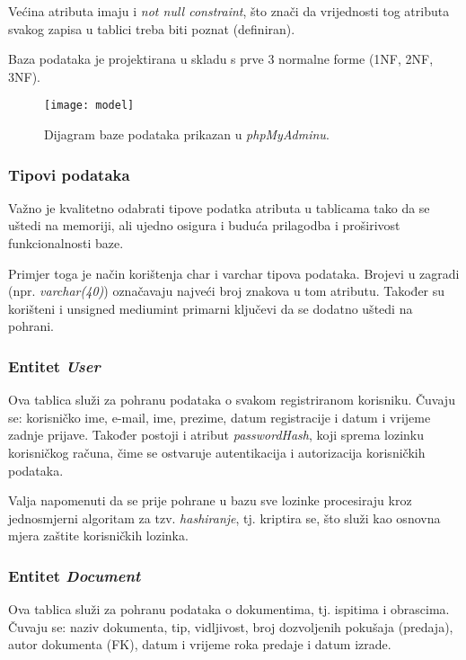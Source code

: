     Većina atributa imaju i \textit{not null constraint}, što znači da
    vrijednosti tog atributa svakog zapisa u tablici treba biti poznat
    (definiran).

    Baza podataka je projektirana u skladu s prve 3 normalne forme (1NF, 2NF,
    3NF).

    \begin{figure}[h]
      \centering
      \texttt{[image: model]}
      \caption{Dijagram baze podataka prikazan u \textit{phpMyAdminu}.}
    \end{figure}

    \subsubsection{Tipovi podataka}

      Važno je kvalitetno odabrati tipove podatka atributa u tablicama tako da
      se uštedi na memoriji, ali ujedno osigura i buduća prilagodba i
      proširivost funkcionalnosti baze.

      Primjer toga je način korištenja char i varchar tipova podataka. Brojevi u
      zagradi (npr. \textit{varchar(40)}) označavaju najveći broj znakova u tom
      atributu. Također su korišteni i unsigned mediumint primarni ključevi da
      se dodatno uštedi na pohrani.

    \subsubsection{Entitet \textit{User}}

      Ova tablica služi za pohranu podataka o svakom registriranom korisniku.
      Čuvaju se: korisničko ime, e-mail, ime, prezime, datum registracije i
      datum i vrijeme zadnje prijave. Također postoji i atribut
      \textit{passwordHash}, koji sprema lozinku korisničkog računa, čime se
      ostvaruje autentikacija i autorizacija korisničkih podataka.

      Valja napomenuti da se prije pohrane u bazu sve lozinke procesiraju kroz
      jednosmjerni algoritam za tzv. \textit{hashiranje}, tj. kriptira se, što
      služi kao osnovna mjera zaštite korisničkih lozinka.

    \subsubsection{Entitet \textit{Document}}

      Ova tablica služi za pohranu podataka o dokumentima, tj. ispitima i
      obrascima. Čuvaju se: naziv dokumenta, tip, vidljivost, broj dozvoljenih
      pokušaja (predaja), autor dokumenta (FK), datum i vrijeme roka predaje i
      datum izrade.

